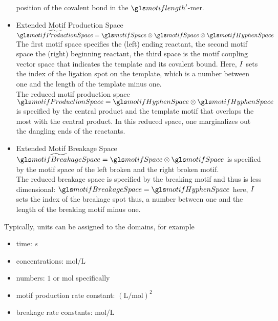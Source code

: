 \begin{itemize}
        position of the covalent bond in the $\motiflength'$-mer.
    \item Extended Motif Production Space $\widetilde \motifProductionSpace
        = \motifSpace
        \otimes \motifSpace
        \otimes \motifHyphenSpace$\\
        The first motif space specifies the (left) ending reactant, the second
        motif space the (right) beginning reactant, the third space is the
        motif coupling vector space that indicates the template and its
        covalent bound.
        Here, $I$ sets the index of the ligation spot on the template,
        which is a number between one and the length of the template minus one.
        \\
        The reduced motif production space $\motifProductionSpace
        = \motifHyphenSpace
        \otimes \motifHyphenSpace$
        is specified by the central product and the template motif
        that overlaps the most with the central product.
        In this reduced space, one marginalizes out the dangling ends of the
        reactants.
    \item Extended Motif Breakage Space $\widetilde \motifBreakageSpace = \motifSpace \otimes
        \motifSpace$ is specified by the motif space of the left broken and the
        right broken motif.
        \\
        The reduced breakage space is specified by the breaking motif and thus
        is less dimensional:
        $\motifBreakageSpace =\motifHyphenSpace$
        here, $I$ sets the index of the breakage spot
        thus, a number between one and the length of the breaking motif minus one.
\end{itemize}
Typically, units can be assigned to the domains, for example
\begin{itemize}
    \item time: $s$
    \item concentrations: $\mathrm{mol}/\mathrm L$
    \item numbers: $1$ or mol specifically
    \item motif production rate constant: $\left( \mathrm L / \mathrm{mol} \right)^2$
    \item breakage rate constants: $\mathrm{mol}/\mathrm{L}$
\end{itemize}
